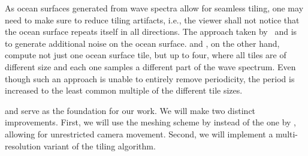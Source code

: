 As ocean surfaces generated from wave spectra allow for seamless tiling,
one may need to make sure to reduce tiling artifacts, i.e., the viewer
shall not notice that the ocean surface repeats itself in all directions.
The approach taken by~\citet{Rydahl:2009} and \citet{NVIDIA:Ocean} is to
generate additional noise on the ocean surface.
\citet{misc:oceanlightingfft} and \citet{article:whitecaps},
on the other hand, compute not just one ocean surface tile, but up to four,
where all tiles are of different size and each one samples a different
part of the wave spectrum. Even though such an approach is unable to
entirely remove periodicity, the period is increased to the least common
multiple of the different tile sizes.

\textcolor{changed}{
\citet{misc:oceanlightingfft} and \citet{article:whitecaps} serve as the foundation
for our work. We will make two distinct improvements. First, we will use the
meshing scheme by \citet{thesis:johanson} instead of the one by \citet{Hinsinger:2002},
allowing for unrestricted camera movement. Second, we will implement
a multi-resolution variant of the tiling algorithm.
}